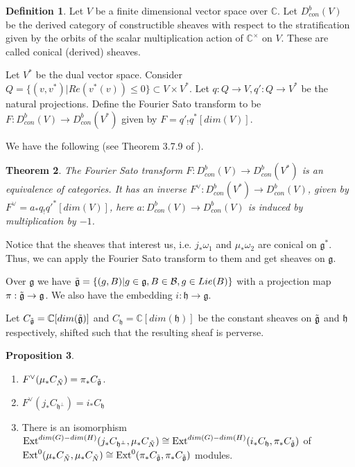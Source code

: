 \documentclass[12pt]{article}
\newcommand{\B}{\mathcal{B}}
\newcommand{\C}{\mathbb{C}}
\theoremstyle{plain}
\newtheorem{theorem}{Theorem}[section]
\theoremstyle{definition}
\newtheorem{prop}[theorem]{Proposition}
\newtheorem{defn}[theorem]{Definition}
\begin{document}
\begin{defn}
    Let $V$ be a finite dimensional vector space over $\C$. Let $D^b_{con}(V)$ be the derived category of constructible sheaves with respect to the stratification given by the orbits of the scalar multiplication action of $\C^\times$ on $V$. These are called conical (derived) sheaves. 

    Let $V^*$ be the dual vector space. Consider $Q=\{(v,v^*)|Re(v^*(v))\leq 0\}\subset V\times V^*$. Let $q:Q\rightarrow V,q':Q\rightarrow V^*$ be the natural projections. Define the Fourier Sato transform to be $F:D^b_{con}(V)\rightarrow D^b_{con}(V^*)$ given by $F=q'_!q^*[dim(V)]$. 
\end{defn}

We have the following (see Theorem 3.7.9 of \cite{KashiwaraSchapira1990}).

\begin{theorem}
    The Fourier Sato transform $F:D^b_{con}(V)\rightarrow D^b_{con}(V^*)$ is an equivalence of categories. It has an inverse $F^\vee:D^b_{con}(V^*)\rightarrow D^b_{con}(V)$, given by $F^\vee=a_*q_!q'^*[dim(V)]$, here $a:D^b_{con}(V)\rightarrow D^b_{con}(V)$ is induced by multiplication by $-1$.
\end{theorem}

Notice that the sheaves that interest us, i.e. $j_*\omega_1$ and $\mu_*\omega_2$ are conical on $\mathfrak{g}^*$. Thus, we can apply the Fourier Sato transform to them and get sheaves on $\mathfrak{g}$.



Over $\mathfrak{g}$ we have $\Tilde{\mathfrak{g}}=\{(g,B)|g\in \mathfrak{g}, B\in \B, g\in Lie(B)\}$ with a projection map $\pi:\Tilde{\mathfrak{g}}\rightarrow \mathfrak{g}$. We also have the embedding $i:\mathfrak{h}\rightarrow\mathfrak{g}$. 

Let $C_{\Tilde{\mathfrak{g}}}=\C[dim(\Tilde{\mathfrak{g}})]$ and $C_\mathfrak{h}=\C[dim(\mathfrak{h})]$ be the constant sheaves on $\Tilde{\mathfrak{g}}$ and $\mathfrak{h}$ respectively, shifted such that the resulting sheaf is perverse. 

\begin{prop}\label{trasnformed sheaves}
    \begin{enumerate}
        \item $F^\vee(\mu_*C_{\Tilde{N}})=\pi_*C_{\Tilde{\mathfrak{g}}}$.
        \item $F^\vee(j_*C_{\mathfrak{h}^\perp})=i_*C_{\mathfrak{h}}$
        
        
        \item There is an isomorphism $\text{Ext}^{dim(G)-dim(H)}(j_*C_{\mathfrak{h}^\perp},\mu_*C_{\Tilde{N}})\cong \text{Ext}^{dim(G)-dim(H)}(i_*C_{\mathfrak{h}},\pi_*C_{\Tilde{\mathfrak{g}}})$ of $\text{Ext}^{0}(\mu_*C_{\Tilde{N}},\mu_*C_{\Tilde{N}})\cong \text{Ext}^{0}(\pi_*C_{\Tilde{\mathfrak{g}}},\pi_*C_{\Tilde{\mathfrak{g}}})$ modules.
    \end{enumerate}
\end{prop}
\end{document}

